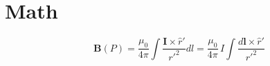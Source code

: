 \documentclass[a4paper]{article}
\begin{document}
\lipsum[1]

\it \lipsum[1]

\section{Math}
\normalfont
\[
\mathbf{B}(P)=\frac{\mu_0}{4\pi}\int\frac{\mathbf{I}\times\hat{r}'}{r'^2}dl = \frac{\mu_0}{4\pi}\,I\!\int\frac{d\boldsymbol{l}\times\hat{r}'}{r'^2}
\]
\end{document}
